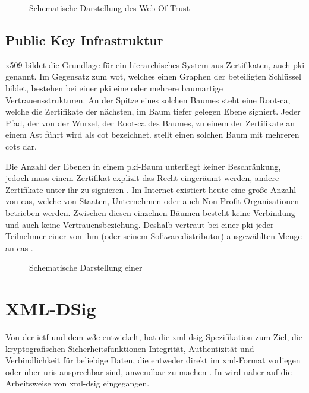 \begin{figure}
\centering

\caption{Schematische Darstellung des Web Of Trust}
\label{fig:wot}
\end{figure}

\subsection{Public Key Infrastruktur}
\gls{x509} bildet die Grundlage für ein hierarchisches System aus Zertifikaten, auch \gls{pki} genannt. Im Gegensatz zum \gls{wot}, welches einen Graphen der
beteiligten Schlüssel bildet, bestehen bei einer \gls{pki} eine oder mehrere baumartige Vertrauensstrukturen.
An der Spitze eines solchen Baumes steht eine Root-\gls{ca}, welche die Zertifikate der nächsten, im Baum tiefer gelegen Ebene signiert. Jeder Pfad, der von der
Wurzel, der Root-\gls{ca} des Baumes, zu einem der Zertifikate an einem Ast führt wird als \gls{cot} bezeichnet.  stellt einen solchen Baum mit
mehreren \glspl{cot} dar.

Die Anzahl der Ebenen in einem \gls{pki}-Baum unterliegt keiner Beschränkung, jedoch muss einem Zertifikat explizit das Recht eingeräumt werden, andere
Zertifikate unter ihr zu signieren \cite{kits}. Im Internet existiert heute eine große Anzahl von \glspl{ca}, welche von Staaten, Unternehmen oder auch
Non-Profit-Organisationen betrieben werden. Zwischen diesen einzelnen Bäumen besteht keine Verbindung und auch keine Vertrauensbeziehung. Deshalb vertraut bei
einer \gls{pki} jeder Teilnehmer einer von ihm (oder seinem Softwaredistributor) ausgewählten Menge an \glspl{ca} \cite{ssliverse:eff}.

\begin{figure}
\centering

\caption{Schematische Darstellung einer \texorpdfstring{\protect{}}{PKI}}
\label{fig:cot}
\end{figure}

\section{XML-DSig}
\label{sec:GrundlagenDefinitionen:xml-dsig}
Von der \gls{ietf} und dem \gls{w3c} entwickelt, hat die \gls{xml-dsig} Spezifikation zum Ziel, die kryptografischen Sicherheitsfunktionen Integrität,
Authentizität und Verbindlichkeit für beliebige Daten, die entweder direkt im \gls{xml}-Format vorliegen oder über \glspl{uri} ansprechbar sind, anwendbar zu
machen \cite{xml-dsig:w3c}. In  wird näher auf die Arbeitsweise von \gls{xml-dsig} eingegangen.


